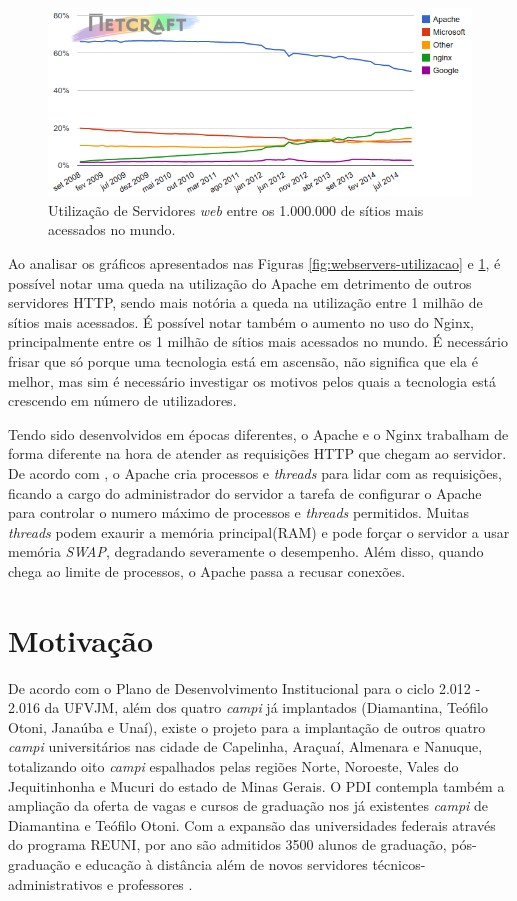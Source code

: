\begin{figure}[htb]
	\centering
	\includegraphics[width=1\linewidth]{figuras/grafico2} 
	\caption{Utilização de Servidores \textit{web} entre os 1.000.000 de sítios 
	mais acessados no mundo.}
	\label{fig:webservers-utilizacao-milhao}
\end{figure}

Ao analisar os gráficos apresentados nas Figuras 
\ref{fig:webservers-utilizacao} e \ref{fig:webservers-utilizacao-milhao}, é 
possível notar uma queda na 
utilização do Apache em detrimento de outros servidores HTTP, sendo mais 
notória a queda na utilização entre 1 milhão de sítios mais acessados. É 
possível notar também o aumento no uso do Nginx, principalmente entre os 1 
milhão de sítios mais acessados no mundo. É necessário frisar que só porque uma 
tecnologia está em ascensão, não significa que ela é melhor, mas sim é 
necessário investigar os motivos pelos quais a tecnologia está crescendo em 
número de utilizadores.

Tendo sido desenvolvidos em épocas diferentes, o Apache e o Nginx trabalham de 
forma diferente na hora de atender as requisições HTTP que chegam ao servidor. 
De acordo com , o Apache cria processos e \textit{threads} 
para lidar com as requisições, ficando a cargo do administrador do servidor a 
tarefa de configurar o Apache para controlar o numero máximo de processos e 
\textit{threads} permitidos. Muitas \textit{threads} podem exaurir a memória 
principal(RAM) e pode forçar o servidor a usar memória \textit{SWAP}, 
degradando severamente o desempenho. Além disso, quando chega ao limite de 
processos, o Apache passa a recusar conexões.

\section{Motivação}
De acordo com o Plano de Desenvolvimento Institucional para o ciclo 2.012 - 
2.016 da UFVJM, além dos quatro \textit{campi} já implantados (Diamantina, 
Teófilo Otoni, Janaúba e Unaí), existe o projeto para a implantação de outros 
quatro \textit{campi} universitários nas cidade de Capelinha, Araçuaí, Almenara 
e Nanuque, totalizando oito \textit{campi} espalhados pelas regiões Norte, 
Noroeste, Vales do Jequitinhonha e Mucuri do estado de Minas Gerais. O 
PDI contempla também a ampliação da oferta de vagas e cursos de graduação 
nos já existentes \textit{campi} de Diamantina e Teófilo Otoni. Com a expansão 
das universidades federais através do programa REUNI, por ano são admitidos 
3500 alunos de graduação, pós-graduação e educação à distância além de novos 
servidores técnicos-administrativos e professores \cite{pdiufvjm}.

